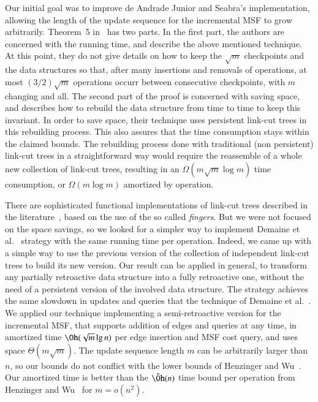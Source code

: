 \documentclass[3p,times,procedia]{elsarticle}
\begin{document}
Our initial goal was to improve de Andrade Junior and Seabra's implementation,
allowing the length of the update sequence for the incremental MSF to grow arbitrarily.
Theorem~5 in~\cite{DemaineIL2007} has two parts.  In the first part, the authors
are concerned with the running time, and describe the above mentioned technique.
At this point, they do not give details on how to keep the $\sqrt{m}$ checkpoints 
and the data structures so that, after many insertions and removals of operations, 
at most $(3/2)\sqrt{m}$ operations occurr between consecutive checkpoints, with 
$m$ changing and all. The second part of the proof is concerned with saving space, 
and describes how to rebuild the data structure from time to time to keep this
invariant.  In order to save space, their technique uses persistent link-cut 
trees in this rebuilding process.  This also assures that the time consumption
stays within the claimed bounds.  The rebuilding process done with traditional
(non persistent) link-cut trees in a straightforward way would require the 
reassemble of a whole new collection of link-cut trees, resulting in an 
$\Omega(m \sqrt{m} \log{m})$ time consumption, or $\Omega(m \log{m})$ 
amortized by operation.

There are sophisticated functional implementations of link-cut trees described in 
the literature~\cite{DemaineLP2008}, based on the use of the so called \emph{fingers}.  
But we were not focused on the space savings, so we looked for a simpler way to 
implement Demaine et al.~\cite{DemaineIL2007} strategy with the same running time 
per operation.  Indeed, we came up with a simple way to use the previous version 
of the collection of independent link-cut trees to build its new version.  
Our result can be applied in general, to transform any partially retroactive 
data structure into a fully retroactive one, without the need of a persistent 
version of the involved data structure.  The strategy achieves the same slowdown 
in updates and queries that the technique of Demaine et al.~\cite{DemaineIL2007}.  
We applied our technique implementing a semi-retroactive version for the 
incremental MSF, that supports addition of edges and queries at any time, 
in amortized time $\Oh(\sqrt{m}\lg n)$ per edge insertion and MSF cost query, 
and uses space $\Theta(m\sqrt{m})$.  The update sequence length $m$ can be 
arbitrarily larger than~$n$, so our bounds do not conflict with the lower 
bounds of Henzinger and Wu~\cite{HenzingerW2021}. Our amortized time is better 
than the $\tilde{\Oh}(n)$ time bound per operation from Henzinger and 
Wu~\cite{HenzingerW2021} for $m = o(n^2)$.
\end{document}
